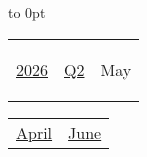 \vbox to 0pt{}


\pagebreak
{\noindent\Large\renewcommand{\arraystretch}{\myNumArrayStretch}\begin{tabular}{|l|l|l}
\hyperlink{2026}{2026} & \hyperlink{Q2}{Q2} & \hypertarget{May}{May}
\end{tabular}\hfill%
\begin{tabular}{r|r@{}}
\hyperlink{April}{April} & \hyperlink{June}{June}
\end{tabular}}
\myLineThick\medskip

{%

\setlength{\tabcolsep}{\myLenTabColSep}%
%
\begin{tabularx}{\linewidth}{|l!{\vrule width \myLenLineThicknessThick}*{7}{@{}X@{}|}}
  

\end{tabularx}}
